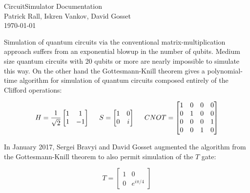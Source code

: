 \documentclass[11pt]{article}
\begin{document}
\begin{center}
    {\LARGE CircuitSimulator Documentation }
\vspace{2mm}
    {\large \\ Patrick Rall, Iskren Vankov, David Gosset \\ \vspace{1mm} \today}
\end{center}

\newenvironment{Figure}
  {\par\medskip\noindent\minipage{\linewidth}}
  {\endminipage\par\medskip}

Simulation of quantum circuits via the conventional matrix-multiplication approach suffers from an exponential blowup in the number of qubits.  Medium size quantum circuits with 20 qubits or more are nearly impossible to simulate this way. On the other hand the Gottesmann-Knill theorem gives a polynomial-time algorithm for simulation of quantum circuits composed entirely of the Clifford operations:

\begin{equation}
    H = \frac{1}{\sqrt{2}} \begin{bmatrix}1 & 1 \\ 1 & -1\end{bmatrix} \hspace{5mm}
    S = \begin{bmatrix}1 & 0 \\ 0 & i\end{bmatrix}
        \hspace{5mm}
        CNOT = \begin{bmatrix}1 & 0 & 0 & 0 \\ 0 & 1 & 0 & 0 \\ 0 & 0 & 0 & 1 \\ 0 & 0 & 1 & 0\end{bmatrix}
\end{equation}

In January 2017, Sergei Bravyi and David Gosset augmented the algorithm from the Gottesmann-Knill theorem to also permit simulation of the $T$ gate:

\begin{equation}
    T = \begin{bmatrix}1 & 0 \\ 0 & e^{i\pi/4}\end{bmatrix}
\end{equation}
\end{document}
